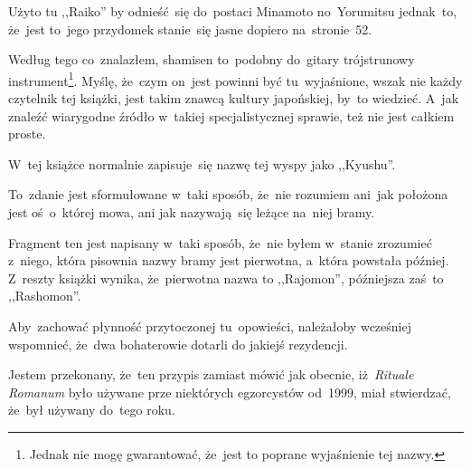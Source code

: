 \documentclass[a4paper,11pt]{article}
\begin{document}
\vspace{\spaceFour}


\start {} Użyto tu ,,Raiko'' %
by odnieść~się do~postaci Minamoto no~Yorumitsu jednak~to, że~jest
to~jego przydomek stanie~się jasne dopiero na~stronie~52.

\vspace{\spaceFour}


\start {} Według tego co~znalazłem, shamisen
to~podobny do~gitary trójstrunowy instrument\footnote{Jednak nie mogę
  gwarantować, że~jest to poprane wyjaśnienie tej nazwy.}. Myślę,
że~czym on~jest powinni być tu~wyjaśnione, wszak nie każdy czytelnik
tej książki, jest takim znawcą kultury japońskiej, by~to wiedzieć.
A~jak znaleźć wiarygodne źródło w~takiej specjalistycznej sprawie, też
nie jest całkiem proste.

\vspace{\spaceFour}


\start {} W~tej książce normalnie zapisuje~się nazwę tej
wyspy jako ,,Kyushu''. %

\vspace{\spaceFour}


\start {} To~zdanie jest sformułowane w~taki sposób,
że~nie rozumiem ani~jak położona jest oś~o~której mowa, ani jak
nazywają~się leżące na~niej bramy.

\vspace{\spaceFour}


\start {} Fragment ten jest napisany w~taki sposób,
że~nie byłem w~stanie zrozumieć z~niego, która pisownia nazwy bramy
jest pierwotna, a~która powstała później. Z~reszty książki wynika,
że~pierwotna nazwa to ,,Rajomon'', %
późniejsza zaś~to ,,Rashomon''. %

\vspace{\spaceFour}


\start {} Aby~zachować płynność przytoczonej
tu~opowieści, należałoby wcześniej wspomnieć, że~dwa bohaterowie
dotarli do jakiejś rezydencji.

\vspace{\spaceFour}


\start {} Jestem przekonany, że~ten przypis
zamiast mówić jak obecnie, iż~\emph{Rituale Romanum} było używane prze
niektórych egzorcystów od~1999, miał stwierdzać, że~był używany
do~tego roku.

\vspace{\spaceFour}
\end{document}
